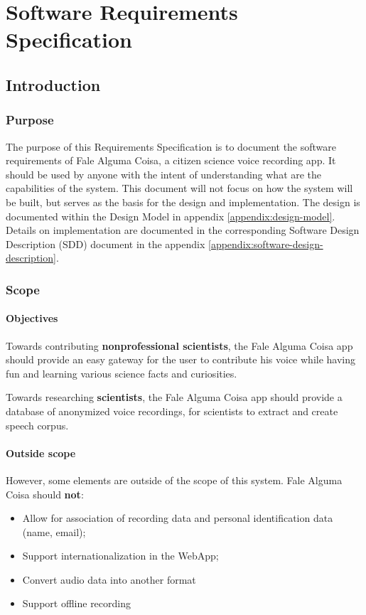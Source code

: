 \chapter{Software Requirements Specification}
\label{appendix:srs}

\section{Introduction}
\subsection{Purpose}
\label{appendix:srs:purpose}

The purpose of this Requirements Specification is to document the software requirements of Fale Alguma Coisa, a citizen science voice recording app. It should be used by anyone with the intent of understanding what are the capabilities of the system. This document will not focus on how the system will be built, but serves as the basis for the design and implementation. The design is documented within the Design Model in appendix \ref{appendix:design-model}. Details on implementation are documented in the corresponding Software Design Description (SDD) document in the appendix \ref{appendix:software-design-description}.

\subsection{Scope}
\label{appendix:srs:scope}

\subsubsection{Objectives}

Towards contributing \textbf{nonprofessional scientists}, the Fale Alguma Coisa app should provide an easy gateway for the user to contribute his voice while having fun and learning various science facts and curiosities.

Towards researching \textbf{scientists}, the Fale Alguma Coisa app should provide a database of anonymized voice recordings, for scientists to extract and create speech corpus.

\subsubsection{Outside scope}

However, some elements are outside of the scope of this system. Fale Alguma Coisa should \textbf{not}:
\begin{itemize}
    \item Allow for association of recording data and personal identification data (name, email);
    \item Support internationalization in the WebApp;
    \item Convert audio data into another format
    \item Support offline recording
\end{itemize}

